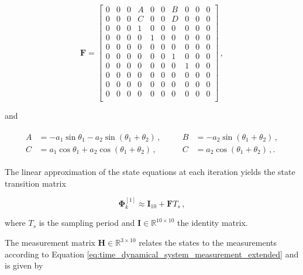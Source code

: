 \begin{equation}
\mathbf{F} = \begin{bmatrix}
  0 & 0 & 0 & A & 0 & 0 & B & 0 & 0 & 0\\
  0 & 0 & 0 & C & 0 & 0 & D & 0 & 0 & 0\\
  0 & 0 & 0 & 1 & 0 & 0 & 0 & 0 & 0 & 0\\
  0 & 0 & 0 & 0 & 1 & 0 & 0 & 0 & 0 & 0\\
  0 & 0 & 0 & 0 & 0 & 0 & 0 & 0 & 0 & 0\\
  0 & 0 & 0 & 0 & 0 & 0 & 1 & 0 & 0 & 0\\
  0 & 0 & 0 & 0 & 0 & 0 & 0 & 1 & 0 & 0\\
  0 & 0 & 0 & 0 & 0 & 0 & 0 & 0 & 0 & 0\\
  0 & 0 & 0 & 0 & 0 & 0 & 0 & 0 & 0 & 0\\
  0 & 0 & 0 & 0 & 0 & 0 & 0 & 0 & 0 & 0\\
\end{bmatrix}\,,
\end{equation}

\noindent
and

\begin{equation*}
  \begin{array}{cc}
  \begin{split}
  	A &= -a_1 \sin \theta_1 -a_2 \sin (\theta_1 + \theta_2)\,, \quad \\
  	C &= a_1 \cos \theta_1 + a_2 \cos (\theta_1 + \theta_2)\,,
  \end{split} &
  \begin{split}
  B &= -a_2 \sin (\theta_1 + \theta_2)\,, \\
  C &= a_2 \cos (\theta_1 + \theta_2)\,,.
  \end{split}
\end{array}
\end{equation*}

\noindent
The linear approximation of the state equations at each iteration yields the state transition matrix

\begin{equation}
  \bm{\Phi}^{[1]}_{k} \approx \mathbf{I}_{10} + \mathbf{F} T_s\,,
\end{equation}

\noindent
where $T_s$ is the sampling period and $\mathbf{I} \in \mathbb{R}^{10 \times 10}$ the identity matrix.

The measurement matrix $\mathbf{H} \in \mathbb{R}^{3 \times 10}$ relates the states to the measurements according to Equation \ref{eq:time_dynamical_system_measurement_extended} and is given by 

